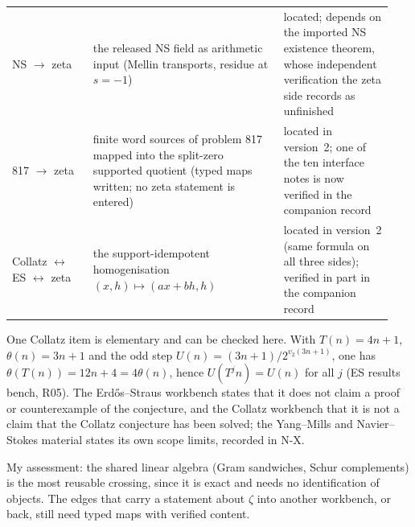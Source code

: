 \begin{center}
\begin{longtable}{@{}p{0.2\linewidth}p{0.47\linewidth}p{0.27\linewidth}@{}}
NS $\to$ zeta & the released NS field as arithmetic input (Mellin transports, residue at $s=-1$) & located; depends on the imported NS existence theorem, whose independent verification the zeta side records as unfinished\\
817 $\to$ zeta & finite word sources of problem 817 mapped into the split-zero supported quotient (typed maps written; no zeta statement is entered) & located in version~2; one of the ten interface notes is now verified in the companion record\\
Collatz $\leftrightarrow$ ES $\leftrightarrow$ zeta & the support-idempotent homogenisation $(x,h)\mapsto(ax+bh,h)$ & located in version~2 (same formula on all three sides); verified in part in the companion record\\
\bottomrule
\end{longtable}
\end{center}

One Collatz item is elementary and can be checked here. With $T(n)=4n+1$, $\theta(n)=3n+1$ and the odd step $U(n)=(3n+1)/2^{v_2(3n+1)}$, one has $\theta(T(n))=12n+4=4\theta(n)$, hence $U(T^jn)=U(n)$ for all $j$ (ES results bench, R05).
The Erdős--Straus workbench states that it does not claim a proof or counterexample of the conjecture, and the Collatz workbench that it is not a claim that the Collatz conjecture has been solved; the Yang--Mills and Navier--Stokes material states its own scope limits, recorded in N-X.

My assessment: the shared linear algebra (Gram sandwiches, Schur complements) is the most reusable crossing, since it is exact and needs no identification of objects. The edges that carry a statement about $\zeta$ into another workbench, or back, still need typed maps with verified content.
